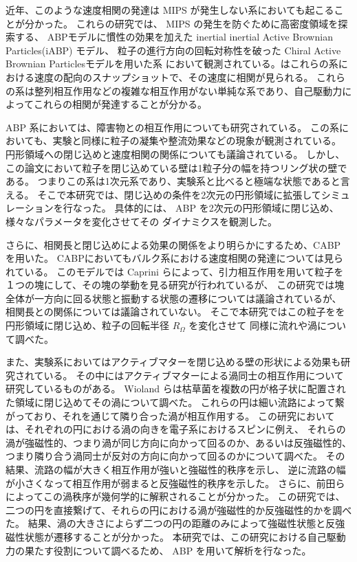 \documentclass[/Users/ikedahajime/GitHub/reserch/master_report/thesis]{subfiles}
\begin{document}
近年、このような速度相関の発達は MIPS が発生しない系においても起こることが分かった。
これらの研究では、 MIPS の発生を防ぐために高密度領域を探索する\cite{szamelLongrangedVelocityCorrelations2021}、
ABPモデルに慣性の効果を加えた inertial inertial Active Brownian Particles(iABP) モデル\cite{kurodaAnomalousFluctuationsHomogeneous2023}、
粒子の進行方向の回転対称性を破った Chiral Active Brownian Particlesモデル\cite{kurodaLongrangeTranslationalOrder2024}を用いた系
において観測されている。はこれらの系における速度の配向のスナップショットで、その速度に相関が見られる。
これらの系は整列相互作用などの複雑な相互作用がない単純な系であり、自己駆動力によってこれらの相関が発達することが分かる。

ABP 系においては、障害物との相互作用についても研究されている。
この系においても、実験と同様に粒子の凝集や整流効果などの現象が観測されている。
円形領域への閉じ込めと速度相関の関係についても議論されている\cite{capriniCollectiveEffectsConfined2021}。
しかし、この論文において粒子を閉じ込めている壁は1粒子分の幅を持つリング状の壁である。
つまりこの系は1次元系であり、実験系と比べると極端な状態であると言える。
そこで本研究では、閉じ込めの条件を2次元の円形領域に拡張してシミュレーションを行なった。
具体的には、 ABP を2次元の円形領域に閉じ込め、様々なパラメータを変化させてその
ダイナミクスを観測した。


さらに、相関長と閉じ込めによる効果の関係をより明らかにするため、CABP を用いた。
CABPにおいてもバルク系における速度相関の発達については見られている\cite{kurodaLongrangeTranslationalOrder2024}。
このモデルでは Caprini らによって、引力相互作用を用いて粒子を１つの塊にして、その塊の挙動を見る研究が行われている\cite{capriniSelfrevertingVorticesChiral2024}が、
この研究では塊全体が一方向に回る状態と振動する状態の遷移については議論されているが、
相関長との関係については議論されていない。
そこで本研究ではこの粒子をを円形領域に閉じ込め、粒子の回転半径 $R_\Omega$ を変化させて
同様に流れや渦について調べた。


また、実験系においてはアクティブマターを閉じ込める壁の形状による効果も研究されている。%
その中にはアクティブマターによる渦同士の相互作用について研究しているものがある。
Wioland らは枯草菌を複数の円が格子状に配置された領域に閉じ込めてその渦について調べた\cite{wiolandFerromagneticAntiferromagneticOrder2016}。
これらの円は細い流路によって繋がっており、それを通じて隣り合った渦が相互作用する。
この研究においては、それぞれの円における渦の向きを電子系におけるスピンに例え、
それらの渦が強磁性的、つまり渦が同じ方向に向かって回るのか、あるいは反強磁性的、
つまり隣り合う渦同士が反対の方向に向かって回るのかについて調べた。
その結果、流路の幅が大きく相互作用が強いと強磁性的秩序を示し、
逆に流路の幅が小さくなって相互作用が弱まると反強磁性的秩序を示した。
さらに、前田らによってこの渦秩序が幾何学的に解釈されることが分かった\cite{beppuGeometrydrivenCollectiveOrdering2017}。
この研究では、二つの円を直接繋げて、それらの円における渦が強磁性的か反強磁性的かを調べた。
結果、渦の大きさによらず二つの円の距離のみによって強磁性状態と反強磁性状態が遷移することが分かった。
本研究では、この研究における自己駆動力の果たす役割について調べるため、 ABP を用いて解析を行なった。
\end{document}
